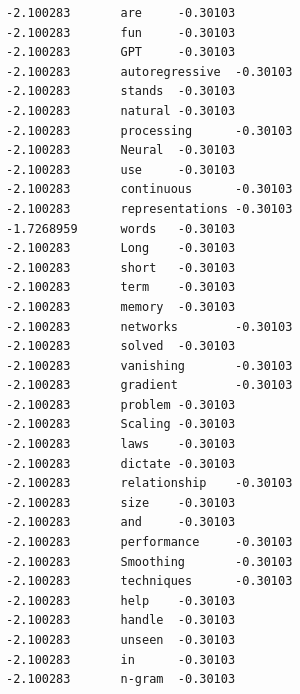 \documentclass[11pt]{article}
\begin{document}
\begin{Verbatim}[commandchars=\\\{\}]
-2.100283       are     -0.30103
-2.100283       fun     -0.30103
-2.100283       GPT     -0.30103
-2.100283       autoregressive  -0.30103
-2.100283       stands  -0.30103
-2.100283       natural -0.30103
-2.100283       processing      -0.30103
-2.100283       Neural  -0.30103
-2.100283       use     -0.30103
-2.100283       continuous      -0.30103
-2.100283       representations -0.30103
-1.7268959      words   -0.30103
-2.100283       Long    -0.30103
-2.100283       short   -0.30103
-2.100283       term    -0.30103
-2.100283       memory  -0.30103
-2.100283       networks        -0.30103
-2.100283       solved  -0.30103
-2.100283       vanishing       -0.30103
-2.100283       gradient        -0.30103
-2.100283       problem -0.30103
-2.100283       Scaling -0.30103
-2.100283       laws    -0.30103
-2.100283       dictate -0.30103
-2.100283       relationship    -0.30103
-2.100283       size    -0.30103
-2.100283       and     -0.30103
-2.100283       performance     -0.30103
-2.100283       Smoothing       -0.30103
-2.100283       techniques      -0.30103
-2.100283       help    -0.30103
-2.100283       handle  -0.30103
-2.100283       unseen  -0.30103
-2.100283       in      -0.30103
-2.100283       n-gram  -0.30103


\end{Verbatim}
\end{document}
